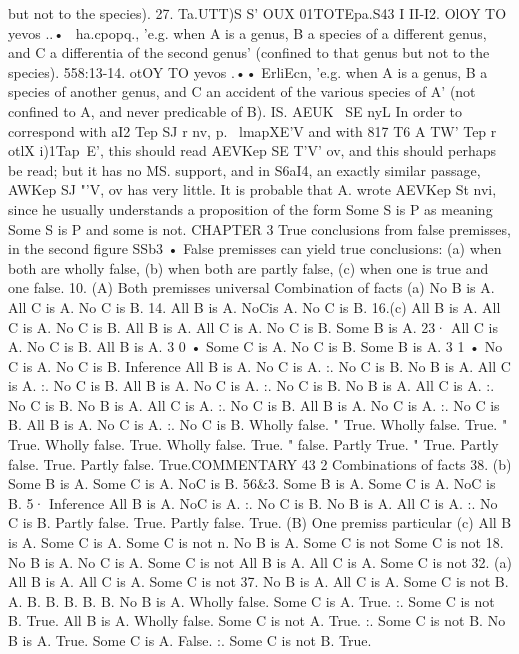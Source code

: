 but not to the species).
27. Ta.UTT)S S' OUX 01TOTEpa.S43 I
II-I2. OlOY TO yevos ..• ~ha.cpopq., 'e.g. when A is a genus, B
a species of a different genus, and C a differentia of the second
genus' (confined to that genus but not to the species).
558:13-14. otOY TO yevos .•• ErliEcn, 'e.g. when A is a genus, B
a species of another genus, and C an accident of the various species
of A' (not confined to A, and never predicable of B).
IS. AEUK~ SE nyL In order to correspond with aI2 Tep SJ r nv,
p.~ lmapXE'V and with 817 T6 A TW' Tep r otlX i)1Tap~E', this should
read AEVKep SE T'V' ov, and this should perhaps be read; but it has
no MS. support, and in S6aI4, an exactly similar passage, AWKep SJ
"'V, ov has very little. It is probable that A. wrote AEVKep St nvi,
since he usually understands a proposition of the form Some S is
P as meaning Some S is P and some is not.
CHAPTER 3
True conclusions from false premisses, in the second figure
SSb3 • False premisses can yield true conclusions: (a) when both
are wholly false, (b) when both are partly false, (c) when one is
true and one false.
10.
(A) Both premisses universal
Combination of facts
(a) No B is A.
All C is A.
No C is B.
14.
All B is A.
NoCis A.
No C is B.
16.(c) All B is A.
All C is A.
No C is B.
All B is A.
All C is A.
No C is B.
Some B is A.
23·
All C is A.
No C is B.
All B is A.
3 0 •
Some C is A.
No C is B.
Some B is A.
3 1 •
No C is A.
No C is B.
Inference
All B is A.
No C is A.
:. No C is B.
No B is A.
All C is A.
:. No C is B.
All B is A.
No C is A.
:. No C is B.
No B is A.
All C is A.
:. No C is B.
No B is A.
All C is A.
:. No C is B.
All B is A.
No C is A.
:. No C is B.
All B is A.
No C is A.
:. No C is B.
Wholly false.
"
True.
Wholly false.
True. "
True.
Wholly false.
True.
Wholly false.
True.
" false.
Partly
True.
"
True.
Partly false.
True.
Partly false.
True.COMMENTARY
43 2
Combinations of facts
38. (b) Some B is A.
Some C is A.
NoC is B.
56&3. Some B is A.
Some C is A.
NoC is B.
5·
Inference
All B is A.
NoC is A.
:. No C is B.
No B is A.
All C is A.
:. No C is B.
Partly false.
True.
Partly false.
True.
(B) One premiss particular
(c) All B is A.
Some C is A.
Some C is not
n.
No B is A.
Some C is not
Some C is not
18.
No B is A.
No C is A.
Some C is not
All B is A.
All C is A.
Some C is not
32. (a) All B is A.
All C is A.
Some C is not
37.
No B is A.
All C is A.
Some C is not
B.
A.
B.
B.
B.
B.
B.
No B is A. Wholly false.
Some C is A. True.
:. Some C is not B. True.
All B is A. Wholly false.
Some C is not A. True.
:. Some C is not B.
No B is A. True.
Some C is A. False.
:. Some C is not B. True.
